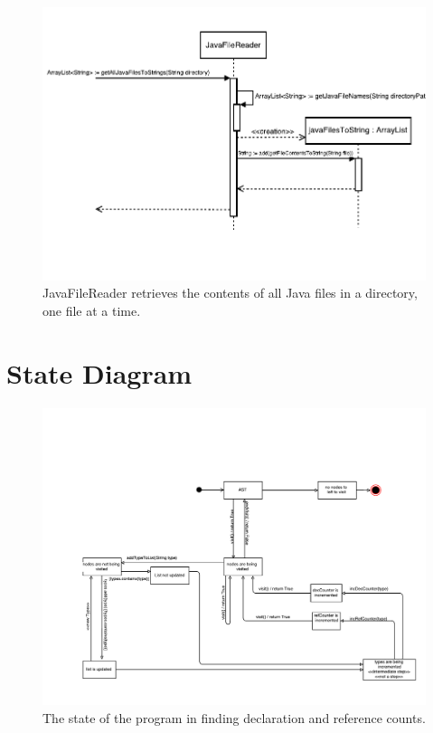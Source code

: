 \documentclass[12p]{article}
\begin{document}
\begin{figure}
  \includegraphics[width=1.0\textwidth]{getAllJavaFilesToString.pdf}
  \caption{JavaFileReader retrieves the contents of all Java files in a directory, one file at a time.} %
  \label{fig:sequence2}
\end{figure}

\newpage

\section{State Diagram}
\begin{figure}[H]
  \includegraphics[width=1.0\textwidth]{State_diagram.pdf}
  \caption{The state of the program in finding declaration and reference counts.} %
  \label{fig:state}
\end{figure}
\end{document}
